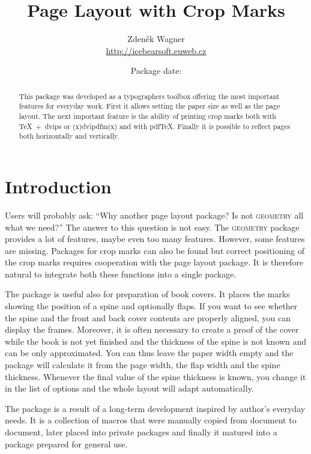 \documentclass[11pt]{article}
\let\pkg\textsc
\begin{document}
\title{Page Layout with Crop Marks}
\author{Zdeněk Wagner\\\url{http://icebearsoft.euweb.cz}}
\date{Package date: }
\maketitle

\begin{abstract}\noindent
This package was developed as a typographers toolbox offering the most important features for
everyday work. First it allows setting the paper size as well as the page layout. The next
important feature is the ability of printing crop marks both with \TeX~+~dvips or (x)dvipdfm(x) and with pdf\TeX.
Finally it is possible to reflect pages both horizontally and vertically.
\end{abstract}

\tableofcontents

\section{Introduction}
Users will probably ask: ``Why another page layout package? Is not \pkg{geometry} all what we
need?'' The answer to this question is not easy. The \pkg{geometry} package provides a lot of
features, maybe even too many features. However, some features are missing. Packages for crop marks
can also be found but correct positioning of the crop marks requires cooperation with the
page layout package. It is therefore natural to integrate both these functions into a single
package.

The package is useful also for preparation of book covers. It places the marks showing the position
of a spine and optionally flaps. If you want to see whether the spine and the front and back cover
contents are properly aligned, you can display the frames. Moreover, it is often necessary to
create a proof of the cover while the book is not yet finished and the thickness of the spine is
not known and can be only approximated. You can thus leave the paper width empty and the package
will calculate it from the page width, the flap width and the spine thickness. Whenever the final
value of the spine thickness is known, you change it in the list of options and the whole layout
will adapt automatically.

The package is a result of a long-term development inspired by author's everyday needs. It is a
collection of macros that were manually copied from document to document, later placed into private
packages and finally it matured into a package prepared for general use.
\end{document}
